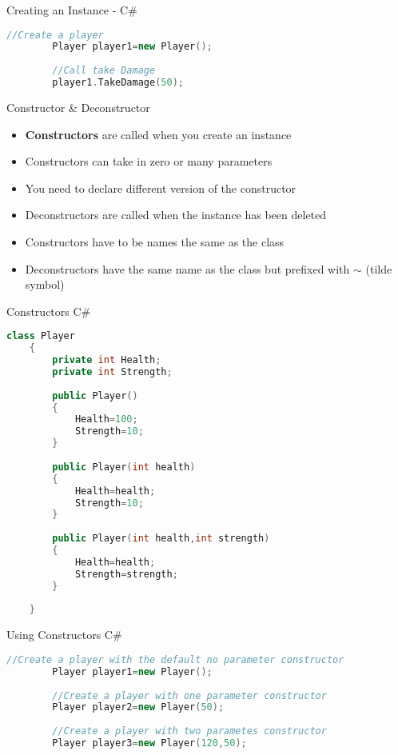 \begin{frame}[fragile]{Creating an Instance - C\#}
	\begin{lstlisting}[language=C++,basicstyle=\tiny,]
		//Create a player
		Player player1=new Player();
		
		//Call take Damage
		player1.TakeDamage(50);
	\end{lstlisting}
\end{frame}

\begin{frame}{Constructor \& Deconstructor}
	\begin{itemize}
		\pause \item \textbf{Constructors} are called when you create an instance
		\pause \item Constructors can take in zero or many parameters
		\pause \item You need to declare different version of the constructor
		\pause \item Deconstructors are called when the instance has been deleted 
		\pause \item Constructors have to be names the same as the class
		\pause \item Deconstructors have the same name as the class but prefixed with \textbf{$\sim$} (tilde symbol)
	\end{itemize}
\end{frame}


\begin{frame}[fragile]{Constructors C\#}
	\begin{lstlisting}[language=C++,basicstyle=\tiny,]
	class Player
	{
		private int Health;
		private int Strength;
		
		public Player()
		{
			Health=100;
			Strength=10;
		}
		
		public Player(int health)
		{
			Health=health;
			Strength=10;	
		}
		
		public Player(int health,int strength)
		{
			Health=health;
			Strength=strength;
		}
		
	}
	\end{lstlisting}
\end{frame}

\begin{frame}[fragile]{Using Constructors C\#}
	\begin{lstlisting}[language=C++,basicstyle=\tiny,]
		//Create a player with the default no parameter constructor
		Player player1=new Player();
		
		//Create a player with one parameter constructor
		Player player2=new Player(50);
		
		//Create a player with two parametes constructor
		Player player3=new Player(120,50);
	\end{lstlisting}
\end{frame}

